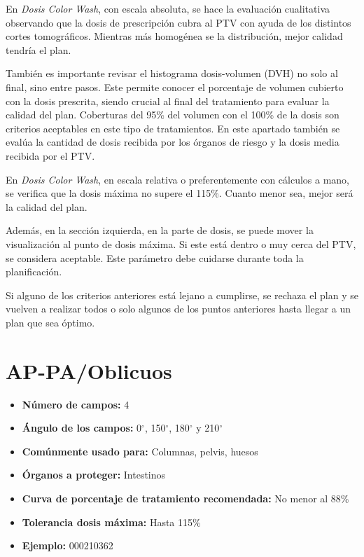 \documentclass{article}
\begin{document}
En \textit{Dosis Color Wash}, con escala absoluta, se hace la evaluación cualitativa observando que la dosis de prescripción cubra al PTV con ayuda de los distintos cortes tomográficos. Mientras más homogénea se la distribución, mejor calidad tendría el plan.

También es importante revisar el histograma dosis-volumen (DVH) no solo al final, sino entre pasos. Este permite conocer el porcentaje de volumen cubierto con la dosis prescrita, siendo crucial al final del tratamiento para evaluar la calidad del plan. Coberturas del 95\% del volumen con el 100\% de la dosis son criterios aceptables en este tipo de tratamientos. En este apartado también se evalúa la cantidad de dosis recibida por los órganos de riesgo y la dosis media recibida por el PTV.

En \textit{Dosis Color Wash}, en escala relativa o preferentemente con cálculos a mano, se verifica que la dosis máxima no supere el 115\%. Cuanto menor sea, mejor será la calidad del plan.

Además, en la sección izquierda, en la parte de dosis, se puede mover la visualización al punto de dosis máxima. Si este está dentro o muy cerca del PTV, se considera aceptable. Este parámetro debe cuidarse durante toda la planificación.

Si alguno de los criterios anteriores está lejano a cumplirse, se rechaza el plan y se vuelven a realizar todos o solo algunos de los puntos anteriores hasta llegar a un plan que sea óptimo.

\vspace{3pt}

\section{AP-PA/Oblicuos}

\begin{center}
    \begin{tcolorbox}[colback=gray!25!white, colframe=gray, title=\textbf{Resumen}, width=0.8\linewidth, center title]
        \begin{itemize}
            \item \textbf{Número de campos:} 4
            \item \textbf{Ángulo de los campos:} 0$^{\circ}$, 150$^{\circ}$, 180$^{\circ}$ y 210$^{\circ}$
            \item \textbf{Comúnmente usado para:} Columnas, pelvis, huesos
            \item \textbf{Órganos a proteger:} Intestinos
            \item \textbf{Curva de porcentaje de tratamiento recomendada:} No menor al 88\%
            \item \textbf{Tolerancia dosis máxima:} Hasta 115\%
            \item \textbf{Ejemplo:} 000210362
        \end{itemize}
    \end{tcolorbox}
\end{center}
\end{document}
